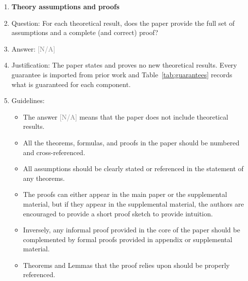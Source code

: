 \documentclass{article}
\providecommand{\answerNA}[1][]{\textcolor{gray}{[N/A] #1}}
\begin{document}
\begin{enumerate}
\begin{itemize}
        \item If applicable, the authors should discuss possible limitations of their approach to address problems of privacy and fairness.
        \item While the authors might fear that complete honesty about limitations might be used by reviewers as grounds for rejection, a worse outcome might be that reviewers discover limitations that aren't acknowledged in the paper. The authors should use their best judgment and recognize that individual actions in favor of transparency play an important role in developing norms that preserve the integrity of the community. Reviewers will be specifically instructed to not penalize honesty concerning limitations.
    \end{itemize}

\item {\bf Theory assumptions and proofs}
    \item[] Question: For each theoretical result, does the paper provide the full set of assumptions and a complete (and correct) proof?
    \item[] Answer: \answerNA{}
    \item[] Justification: The paper states and proves no new theoretical results. Every guarantee is imported from prior work and Table~\ref{tab:guarantees} records what is guaranteed for each component.
    \item[] Guidelines:
    \begin{itemize}
        \item The answer \answerNA{} means that the paper does not include theoretical results.
        \item All the theorems, formulas, and proofs in the paper should be numbered and cross-referenced.
        \item All assumptions should be clearly stated or referenced in the statement of any theorems.
        \item The proofs can either appear in the main paper or the supplemental material, but if they appear in the supplemental material, the authors are encouraged to provide a short proof sketch to provide intuition.
        \item Inversely, any informal proof provided in the core of the paper should be complemented by formal proofs provided in appendix or supplemental material.
        \item Theorems and Lemmas that the proof relies upon should be properly referenced.
    \end{itemize}


\end{enumerate}
\end{document}
